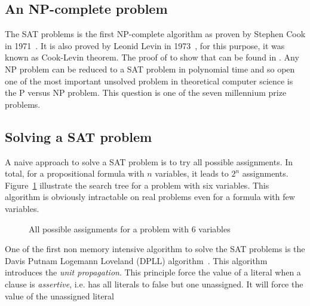 \subsection{An NP-complete problem}


The SAT problems is the first NP-complete algorithm as proven by Stephen Cook in 1971~\cite{cook1971complexity}.
It is also proved by Leonid Levin in 1973~\cite{4640789}, for this purpose, it was known as Cook-Levin theorem.
The proof of to show that can be found in \cite{sipser2006introduction}.
Any NP problem can be reduced to a SAT problem in polynomial time and so open one of the most important 
unsolved problem in theoretical computer science is the P versus NP problem.
This question is one of the seven millennium prize problems.


%
%


\subsection{Solving a SAT problem}

A naive approach to solve a SAT problem is to try all possible assignments. In total,
for a propositional formula with $n$ variables, it leads to $2^n$ assignments.  
Figure~\ref{fig:naive_algo} illustrate the search tree for a problem with six variables.
This algorithm is obviously intractable on real problems even for a formula with few variables. 
 
\begin{figure}[H]
	\centering
	
	\caption{All possible assignments for a problem with 6 variables}
	\label{fig:naive_algo}
\end{figure}


One of the first non memory intensive algorithm to solve the SAT problems is 
the Davis Putnam Logemann Loveland (DPLL) algorithm~\cite{dpll_62}. 
This algorithm introduces the \emph{unit propagation}.
This principle force the value of a literal when a clause is \emph{assertive}, i.e. 
has all literals to false but one unassigned. It will force the value of the unassigned literal 


